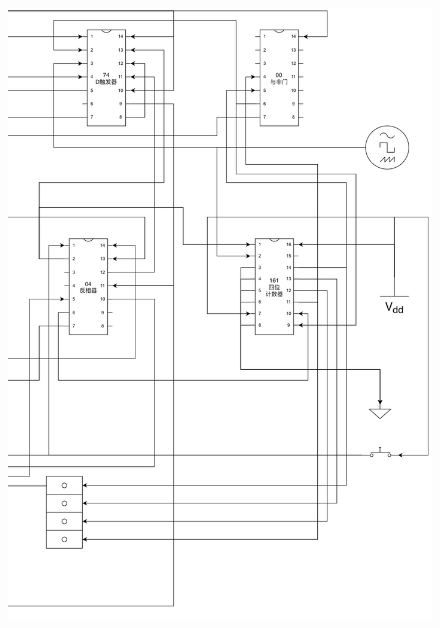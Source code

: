 \documentclass[a4paper]{article}
\begin{document}
\begin{figure}[H]
    \centering
    \includegraphics[width=0.9\linewidth]{figures/g2}
\end{figure}
\end{document}
